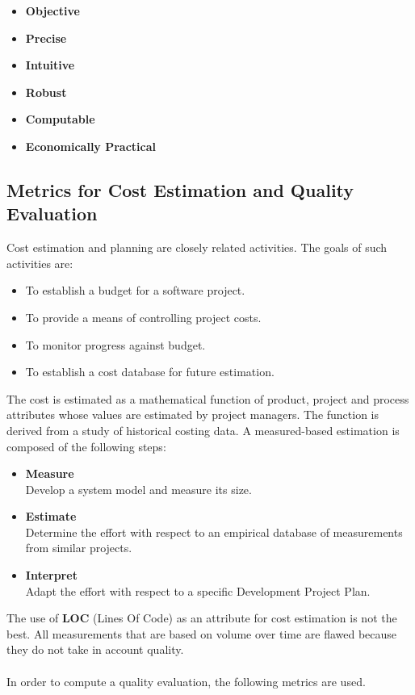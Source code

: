 \documentclass{article}
\begin{document}
\begin{itemize}
	\item \textbf{Objective}
	\item \textbf{Precise}
	\item \textbf{Intuitive}
	\item \textbf{Robust}
	\item \textbf{Computable}
	\item \textbf{Economically Practical}
\end{itemize}

\subsection{Metrics for Cost Estimation and Quality Evaluation}
Cost estimation and planning are closely related activities. The goals of such activities are:

\begin{itemize}
	\item To establish a budget for a software project.
	\item To provide a means of controlling project costs.
	\item To monitor progress against budget.
	\item To establish a cost database for future estimation.
\end{itemize}
The cost is estimated as a mathematical function of product, project and process attributes whose values are estimated by project managers. The function is derived from a study of historical costing data. A measured-based estimation is composed of the following steps:

\begin{itemize}
	\item \textbf{Measure}
	\vspace{.2cm} \\
	Develop a system model and measure its size.
	
	\item \textbf{Estimate}
	\vspace{.2cm} \\
	Determine the effort with respect to an empirical database of measurements from similar projects.
	
	\item \textbf{Interpret}
	\vspace{.2cm} \\
	Adapt the effort with respect to a specific Development Project Plan.
\end{itemize}
The use of \textbf{LOC} (Lines Of Code) as an attribute for cost estimation is not the best. All measurements that are based on volume over time are flawed because they do not take in account quality. \\ \\
In order to compute a quality evaluation, the following metrics are used.
\end{document}
